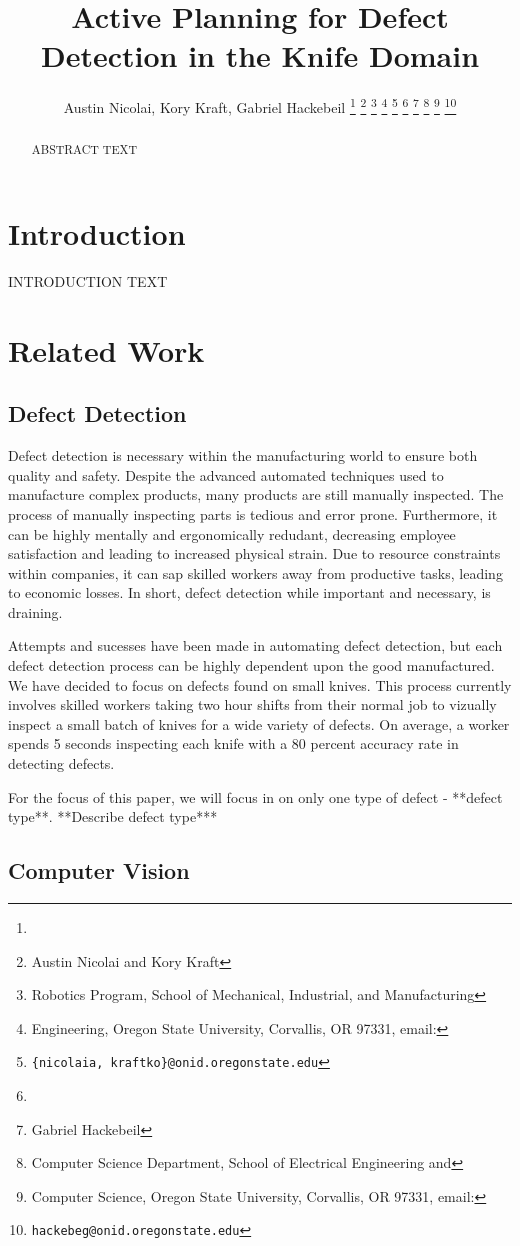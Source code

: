 \documentclass[letterpaper, 10 pt, conference]{ieeeconf}  %
\title{\LARGE \bf 
Active Planning for Defect Detection in the Knife Domain
}
\author{Austin Nicolai, Kory Kraft, Gabriel Hackebeil%
\thanks{\hrulefill}
\thanks{Austin Nicolai and Kory Kraft}
\thanks{Robotics Program, School of Mechanical, Industrial, and Manufacturing}
\thanks{Engineering, Oregon State University, Corvallis, OR 97331, email: }
\thanks{{\tt\small \{nicolaia, kraftko\}@onid.oregonstate.edu}}
\thanks{\hfill}
\thanks{Gabriel Hackebeil}
\thanks{Computer Science Department, School of Electrical Engineering and}
\thanks{Computer Science, Oregon State University, Corvallis, OR 97331, email: }
\thanks{{\tt\small hackebeg@onid.oregonstate.edu}}
}
\begin{document}
\maketitle
\thispagestyle{empty}
\pagestyle{empty}

\begin{abstract}
ABSTRACT TEXT
\end{abstract}


\section{Introduction}

INTRODUCTION TEXT\cite{placeholder}

\section{Related Work}

\subsection{Defect Detection}
Defect detection is necessary within the manufacturing world to ensure both quality and safety. Despite the advanced automated techniques used to manufacture complex products, many products are still manually inspected. The process of manually inspecting parts is tedious and error prone. Furthermore, it can be highly mentally and ergonomically redudant, decreasing employee satisfaction and leading to increased physical strain. Due to resource constraints within companies, it can sap skilled workers away from productive tasks, leading to economic losses. In short, defect detection while important and necessary, is draining.

Attempts and sucesses have been made in automating defect detection, but each defect detection process can be highly dependent upon the good manufactured. We have decided to focus on defects found on small knives. This process currently involves skilled workers taking two hour shifts from their normal job to vizually inspect a small batch of knives for a wide variety of defects. On average, a worker spends 5 seconds inspecting each knife with a 80 percent accuracy rate in detecting defects.

For the focus of this paper, we will focus in on only one type of defect - **defect type**. **Describe defect type***

\subsection{Computer Vision}
\end{document}
